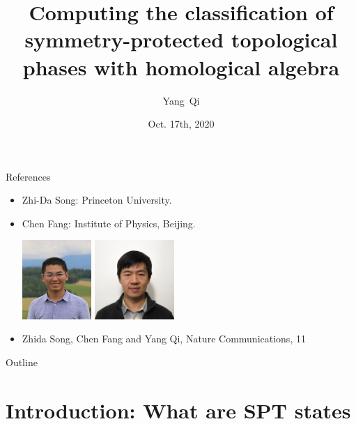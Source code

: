 \documentclass[xcolor=table, aspectratio=43,ignorenonframetext]{beamer}
\title %
{Computing the classification of symmetry-protected topological phases with homological algebra}
\author[Y Qi] %
{Yang~Qi}
\institute[Fudan] %
{
Department of Physics, Fudan University.
}
\date{Oct. 17th, 2020}
\begin{document}
\begin{frame}
  \titlepage
\end{frame}

\begin{frame}{References}
\begin{itemize}
\item Zhi-Da Song: Princeton University.
\item Chen Fang: Institute of Physics, Beijing.
\begin{center}
	\includegraphics[height=3cm]{../people/zhidasong}
	\includegraphics[height=3cm]{../people/chenfang}
\end{center}
\item Zhida Song, Chen Fang and Yang Qi, Nature Communications, 11
\end{itemize}
\end{frame}

\begin{frame}{Outline}
		\tableofcontents
\end{frame}

\section{Introduction: What are SPT states}
\end{document}

